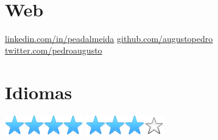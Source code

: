 \documentclass[a4paper]{cv-style}
\begin{document}

\begin{aside}
~
%
\section{Web}
{\small\faLinkedin\space}\underline{\href{https://linkedin.com/in/peadalmeida}{linkedin.com/in/peadalmeida}}
{\small\faGithub\space}\underline{\href{https://github.com/augustopedro}{github.com/augustopedro}}
{\small\faTwitter\space}\underline{\href{https://twitter.com/pedroaugusto}{twitter.com/pedroaugusto}}
~
\section{Idiomas}
%
{\includegraphics[scale=0.30]{img/star.png}\includegraphics[scale=0.30]{img/star.png}\includegraphics[scale=0.30]{img/star.png}\includegraphics[scale=0.30]{img/star.png}}
%
{\includegraphics[scale=0.30]{img/star.png}\includegraphics[scale=0.30]{img/star.png}\includegraphics[scale=0.30]{img/star.png}\includegraphics[scale=0.30]{img/star_empty.png}}
~

\end{aside}
\end{document}
